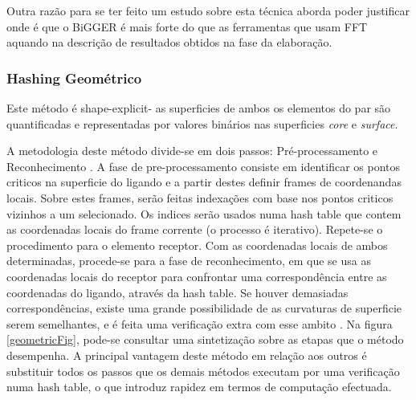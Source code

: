 Outra razão para se ter feito um estudo sobre esta técnica aborda poder justificar onde é que o BiGGER é mais forte do que as ferramentas que usam FFT aquando na descrição de resultados obtidos na fase da elaboração.
 


\subsubsection{Hashing Geométrico }
Este método é shape-explicit- as superficies de ambos os elementos do par são quantificadas e representadas por valores binários nas superficies \textit{core} e \textit{surface}.

A metodologia deste método divide-se em dois passos: Pré-processamento e Reconhecimento \cite{geometry}.
A fase de pre-processamento consiste em identificar os pontos criticos na superficie do ligando e a partir destes definir frames de coordenandas locais. Sobre estes frames, serão feitas indexações com base nos pontos criticos vizinhos a um selecionado. Os indices serão usados numa hash table que contem as coordenadas locais do frame corrente (o processo é iterativo). Repete-se o procedimento para o elemento receptor. Com as coordenadas locais de ambos determinadas, procede-se para a fase de reconhecimento, em que se usa as coordenadas locais do receptor para confrontar uma correspondência entre as coordenadas do ligando, através da hash table. Se houver demasiadas correspondências, existe uma grande possibilidade de as curvaturas de superficie serem semelhantes, e é feita uma verificação extra com esse ambito \cite{prediction}. Na figura \ref{geometricFig}, pode-se consultar uma sintetização sobre as etapas que o método desempenha. 
A principal vantagem deste método em relação aos outros é substituir todos os passos que os demais métodos executam por uma verificação numa hash table, o que introduz rapidez em termos de computação efectuada. 

